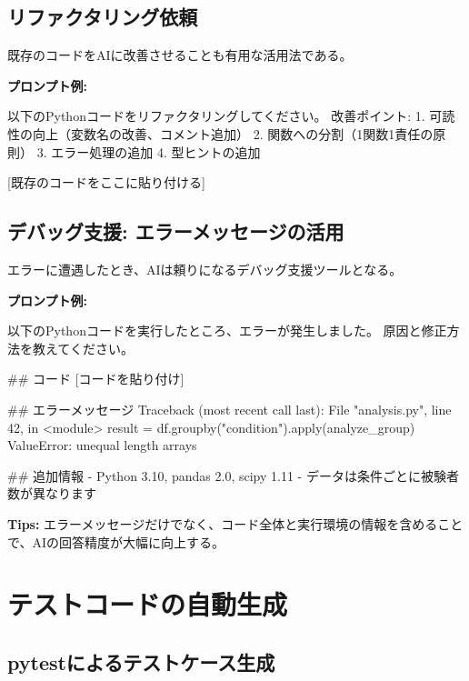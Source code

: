 \subsection{リファクタリング依頼}

既存のコードをAIに改善させることも有用な活用法である。

\textbf{プロンプト例:}

\begin{promptbox}
以下のPythonコードをリファクタリングしてください。
改善ポイント:
1. 可読性の向上（変数名の改善、コメント追加）
2. 関数への分割（1関数1責任の原則）
3. エラー処理の追加
4. 型ヒントの追加

{[}既存のコードをここに貼り付ける]
\end{promptbox}

\subsection{デバッグ支援: エラーメッセージの活用}

エラーに遭遇したとき、AIは頼りになるデバッグ支援ツールとなる。

\textbf{プロンプト例:}

\begin{promptbox}
以下のPythonコードを実行したところ、エラーが発生しました。
原因と修正方法を教えてください。

\#\# コード
{[}コードを貼り付け]

\#\# エラーメッセージ
Traceback (most recent call last):
  File "analysis.py", line 42, in <module>
    result = df.groupby("condition").apply(analyze\_group)
ValueError: unequal length arrays

\#\# 追加情報
- Python 3.10, pandas 2.0, scipy 1.11
- データは条件ごとに被験者数が異なります
\end{promptbox}

\textbf{Tips:} エラーメッセージだけでなく、コード全体と実行環境の情報を含めることで、AIの回答精度が大幅に向上する。

\section{テストコードの自動生成}
\label{sec:6.5}

\subsection{pytestによるテストケース生成}

